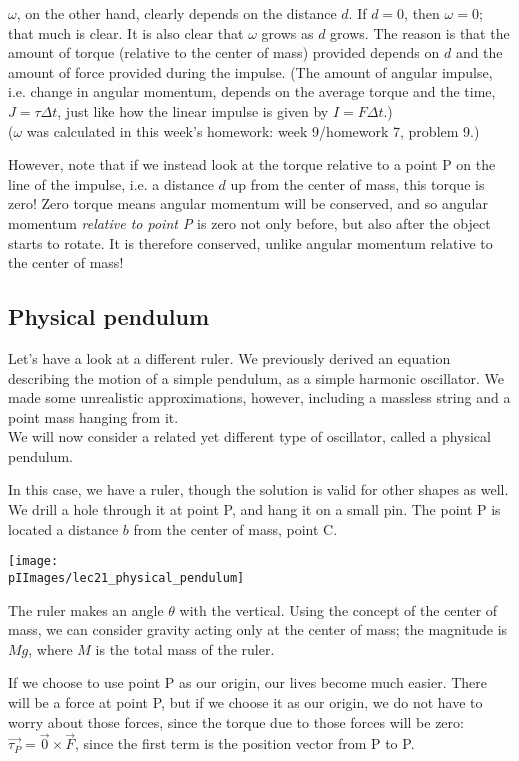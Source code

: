 $\omega$, on the other hand, clearly depends on the distance $d$. If $d = 0$, then $\omega = 0$; that much is clear. It is also clear that $\omega$ grows as $d$ grows. The reason is that the amount of torque (relative to the center of mass) provided depends on $d$ and the amount of force provided during the impulse. (The amount of angular impulse, i.e. change in angular momentum, depends on the average torque and the time, $J = \tau \Delta t$, just like how the linear impulse is given by $I = F \Delta t$.)\\
($\omega$ was calculated in this week's homework: week 9/homework 7, problem 9.)

However, note that if we instead look at the torque relative to a point P on the line of the impulse, i.e. a distance $d$ up from the center of mass, this torque is zero! Zero torque means angular momentum will be conserved, and so angular momentum \emph{relative to point P} is zero not only before, but also after the object starts to rotate. It is therefore conserved, unlike angular momentum relative to the center of mass!

\subsection{Physical pendulum}

Let's have a look at a different ruler. We previously derived an equation describing the motion of a simple pendulum, as a simple harmonic oscillator. We made some unrealistic approximations, however, including a massless string and a point mass hanging from it.\\
We will now consider a related yet different type of oscillator, called a physical pendulum.

In this case, we have a ruler, though the solution is valid for other shapes as well. We drill a hole through it at point P, and hang it on a small pin. The point P is located a distance $b$ from the center of mass, point C.

\begin{center}
\texttt{[image: \\pIImages/lec21\_physical\_pendulum]}
\end{center}

The ruler makes an angle $\theta$ with the vertical. Using the concept of the center of mass, we can consider gravity acting only at the center of mass; the magnitude is $M g$, where $M$ is the total mass of the ruler.

If we choose to use point P as our origin, our lives become much easier. There will be a force at point P, but if we choose it as our origin, we do not have to worry about those forces, since the torque due to those forces will be zero: $\vec{\tau_P} = \vec{0} \times \vec{F}$, since the first term is the position vector from P to P.

